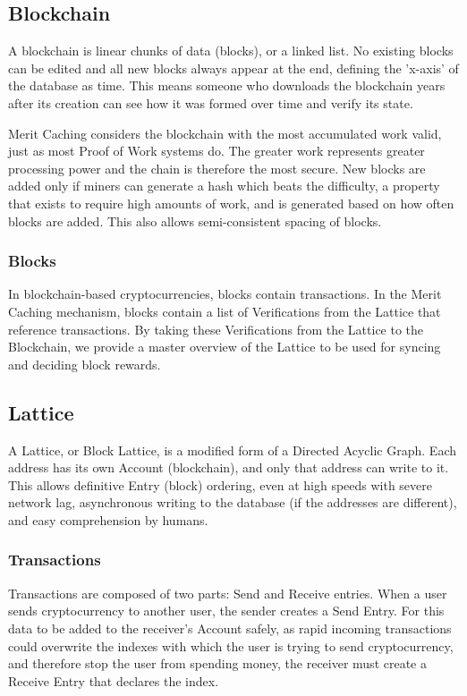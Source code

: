 \documentclass[14pt]{article}
\begin{document}
\label{sec:1.1}
\subsection{Blockchain}
A blockchain is linear chunks of data (blocks), or a linked list. No existing blocks can be edited and all new blocks always appear at the end, defining the 'x-axis' of the database as time. This means someone who downloads the blockchain years after its creation can see how it was formed over time and verify its state. 

Merit Caching considers the blockchain with the most accumulated work valid, just as most Proof of Work systems do. The greater work represents greater processing power and the chain is therefore the most secure. New blocks are added only if miners can generate a hash which beats the difficulty, a property that exists to require high amounts of work, and is generated based on how often blocks are added. This also allows semi-consistent spacing of blocks.

\label{sec:1.1.1}
\subsubsection{Blocks}
In blockchain-based cryptocurrencies, blocks contain transactions. In the Merit Caching mechanism, blocks contain a list of Verifications from the Lattice that reference transactions. By taking these Verifications from the Lattice to the Blockchain, we provide a master overview of the Lattice to be used for syncing and deciding block rewards.

\label{sec:1.2}
\subsection{Lattice}
A Lattice, or Block Lattice, is a modified form of a Directed Acyclic Graph. Each address has its own Account (blockchain), and only that address can write to it. This allows definitive Entry (block) ordering, even at high speeds with severe network lag, asynchronous writing to the database (if the addresses are different), and easy comprehension by humans.

\label{sec:1.2.1}
\subsubsection{Transactions}
Transactions are composed of two parts: Send and Receive entries. When a user sends cryptocurrency to another user, the sender creates a Send Entry. For this data to be added to the receiver's Account safely, as rapid incoming transactions could overwrite the indexes with which the user is trying to send cryptocurrency, and therefore stop the user from spending money, the receiver must create a Receive Entry that declares the index.
\end{document}
